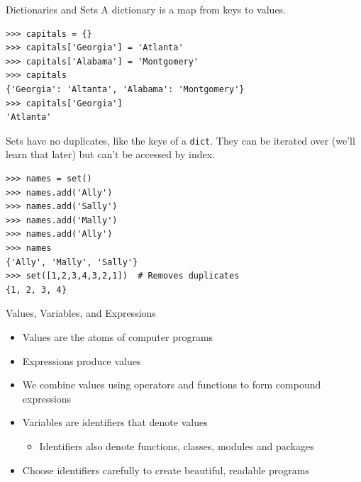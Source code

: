 \documentclass[smaller, aspectratio=1610]{beamer}
\begin{document}
\begin{frame}[label={sec:org2bf3e69},fragile]{Dictionaries and Sets}
 A dictionary is a map from keys to values.

\lstset{language=Python,label= ,caption= ,captionpos=b,numbers=none}
\begin{lstlisting}
>>> capitals = {}
>>> capitals['Georgia'] = 'Atlanta'
>>> capitals['Alabama'] = 'Montgomery'
>>> capitals
{'Georgia': 'Altanta', 'Alabama': 'Montgomery'}
>>> capitals['Georgia']
'Atlanta'
\end{lstlisting}

Sets have no duplicates, like the keys of a \texttt{dict}. They can be iterated over (we'll learn that later) but can't be accessed by index.

\lstset{language=Python,label= ,caption= ,captionpos=b,numbers=none}
\begin{lstlisting}
>>> names = set()
>>> names.add('Ally')
>>> names.add('Sally')
>>> names.add('Mally')
>>> names.add('Ally')
>>> names
{'Ally', 'Mally', 'Sally'}
>>> set([1,2,3,4,3,2,1])  # Removes duplicates
{1, 2, 3, 4}
\end{lstlisting}
\end{frame}


\begin{frame}[label={sec:orgaf2afe3}]{Values, Variables, and Expressions}
\begin{itemize}
\item Values are the atoms of computer programs
\item Expressions produce values
\item We combine values using operators and functions to form compound expressions
\item Variables are identifiers that denote values
\begin{itemize}
\item Identifiers also denote functions, classes, modules and packages
\end{itemize}
\item Choose identifiers carefully to create beautiful, readable programs
\end{itemize}
\end{frame}
\end{document}
